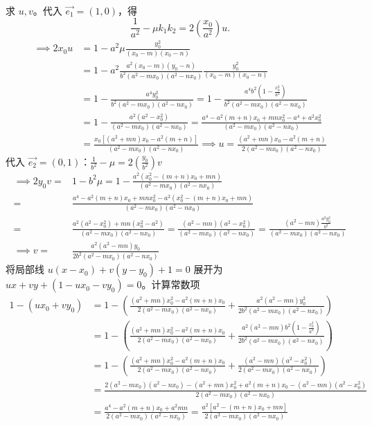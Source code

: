 \begin{solution}
\begin{align*}
\end{align*}
求 $u,v$。代入 $\vec{e_1} = (1,0)$，得
$$\frac{1}{a^2} - \mu k_1k_2 = 2\left(\frac{x_0}{a^2}\right)u.$$
\begin{align*}
\implies 2x_0 u &= 1 - a^2 \mu \frac{y_0^2}{(x_0-m)(x_0-n)}\\
&=1 - a^2 \frac{a^2(x_0-m)(y_0-n)}{b^2(a^2-mx_0)(a^2-nx_0)} \frac{y_0^2}{(x_0-m)(x_0-n)}\\
&=1 - \frac{a^4y_0^2}{b^2(a^2-mx_0)(a^2-nx_0)}= 1 - \frac{a^4b^2(1-\frac{x_0^2}{a^2})}{b^2(a^2-mx_0)(a^2-nx_0)}\\
&= 1 - \frac{a^2(a^2-x_0^2)}{(a^2-mx_0)(a^2-nx_0)}=\frac{a^4 - a^2(m+n)x_0 + mn x_0^2 - a^4 + a^2 x_0^2}{(a^2-mx_0)(a^2-nx_0)} \\
&= \frac{x_0[(a^2+mn)x_0 - a^2(m+n)]}{(a^2-mx_0)(a^2-nx_0)}\implies u = \frac{(a^2+mn)x_0 - a^2(m+n)}{2 (a^2-mx_0)(a^2-nx_0)}
\end{align*}
代入 $\vec{e_2} = (0,1)$：$\frac{1}{b^2} - \mu = 2\left(\frac{y_0}{b^2}\right)v $
\begin{align*}
\implies 2y_0 v =& 1 - b^2 \mu = 1 - \frac{a^2(x_0^2-(m+n)x_0+mn)}{ (a^2-mx_0)(a^2-nx_0)}\\
=&\frac{a^4-a^2(m+n)x_0+mnx_0^2-a^2(x_0^2-(m+n)x_0+mn)}{ (a^2-mx_0)(a^2-nx_0)}\\
=&\frac{a^2(a^2-x_0^2)+mn(x_0^2-a^2)}{ (a^2-mx_0)(a^2-nx_0)}=\frac{(a^2-mn)(a^2-x_0^2)}{(a^2-mx_0)(a^2-nx_0)}=\frac{(a^2-mn)\frac{a^2y_0^2}{b^2}}{(a^2-mx_0)(a^2-nx_0)}\\
\implies v =& \frac{a^2(a^2-mn)y_0}{2 b^2  (a^2-mx_0)(a^2-nx_0)}
\end{align*}
将局部线 $u(x-x_0) + v(y-y_0) + 1 = 0$ 展开为 $ux + vy + (1 - ux_0 - vy_0) = 0$。计算常数项 
\begin{align*}
1 - (ux_0 + vy_0)&=1-\left(\frac{(a^2+mn)x_0^2 - a^2(m+n)x_0}{2 (a^2-mx_0)(a^2-nx_0)} + \frac{a^2(a^2-mn)y_0^2}{2b^2 (a^2-mx_0)(a^2-nx_0)}\right)\\
&=1-\left(\frac{(a^2+mn)x_0^2 - a^2(m+n)x_0}{2 (a^2-mx_0)(a^2-nx_0)} + \frac{a^2(a^2-mn)b^2(1-\frac{x_0^2}{a^2})}{2b^2 (a^2-mx_0)(a^2-nx_0)}\right)\\
&=1-\left(\frac{(a^2+mn)x_0^2 - a^2(m+n)x_0}{2 (a^2-mx_0)(a^2-nx_0)} + \frac{(a^2-mn)(a^2-x_0^2)}{2(a^2-mx_0)(a^2-nx_0)}\right)\\
&=\frac{2(a^2-mx_0)(a^2-nx_0)-(a^2+mn)x_0^2 + a^2(m+n)x_0-(a^2-mn)(a^2-x_0^2)}{2(a^2-mx_0)(a^2-nx_0)}\\
&= \frac{a^4 - a^2(m+n)x_0 + a^2 mn}{2(a^2-mx_0)(a^2-nx_0)} = \frac{a^2[a^2 - (m+n)x_0 + mn]}{2(a^2-mx_0)(a^2-nx_0)}

\end{align*}
\end{solution}
